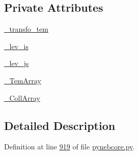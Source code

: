 \subsection*{Private Attributes}
\begin{DoxyCompactItemize}
\item 
\hyperlink{classpyneb_1_1core_1_1pynebcore_1_1___coll_data_ascii_aaf268c621d916f4ea71bb5825e249200}{\-\_\-transfo\-\_\-tem}
\item 
\hyperlink{classpyneb_1_1core_1_1pynebcore_1_1___coll_data_ascii_a87c7c234487963a3d9d015294637e59a}{\-\_\-lev\-\_\-is}
\item 
\hyperlink{classpyneb_1_1core_1_1pynebcore_1_1___coll_data_ascii_a8c077039b4837a27b71583f26dd858a8}{\-\_\-lev\-\_\-js}
\item 
\hyperlink{classpyneb_1_1core_1_1pynebcore_1_1___coll_data_ascii_adb47c4cf2b9f3b82a281d0277e136693}{\-\_\-\-Tem\-Array}
\item 
\hyperlink{classpyneb_1_1core_1_1pynebcore_1_1___coll_data_ascii_a01539063e6fade51b407dba1faa011c6}{\-\_\-\-Coll\-Array}
\end{DoxyCompactItemize}


\subsection{Detailed Description}


Definition at line \hyperlink{pynebcore_8py_source_l00919}{919} of file \hyperlink{pynebcore_8py_source}{pynebcore.\-py}.



